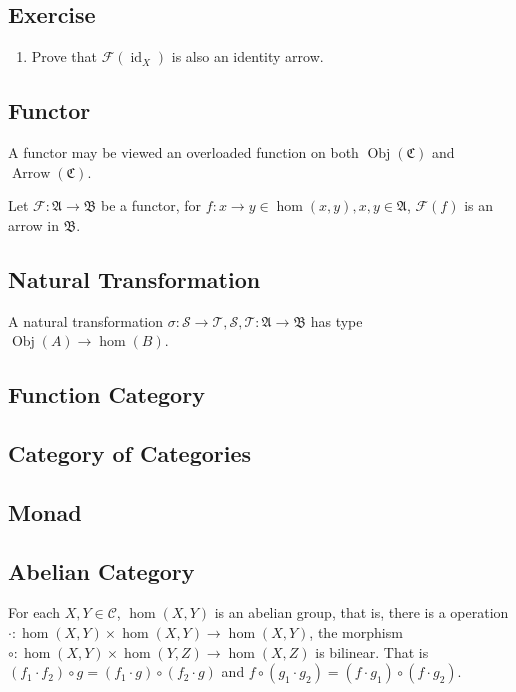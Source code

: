 \documentclass{article}
\newcommand{\id}{\mathop{\mathrm{id}}}
\newcommand{\obj}{\mathop{\mathrm{Obj}}}
\newcommand{\arrow}{\mathop{\mathrm{Arrow}}}
\begin{document}
\subsection*{Exercise}
\begin{enumerate}[1.]
\item Prove that $\mathcal{F}(\id_X)$ is also an identity arrow.
\end{enumerate}

\subsection{Functor}
A functor may be viewed an overloaded function on both $\obj(\mathfrak C)$ and
$\arrow(\mathfrak C)$.

Let $\mathcal F : \mathfrak A \to \mathfrak B$ be a functor,
for $f : x \to y \in \hom(x, y), x, y \in \mathfrak A$,
$\mathcal F(f)$ is an arrow in $\mathfrak B$.


\subsection{Natural Transformation}
A natural transformation
$\sigma : \mathcal S \to \mathcal T,
\mathcal S, \mathcal T : \mathfrak A \to \mathfrak B$ has type
$\obj(A) \to \hom(B)$.


\subsection{Function Category}

\subsection{Category of Categories}

\subsection{Monad}

\subsection{Abelian Category}
For each $X, Y \in \mathcal{C}$, $\hom(X, Y)$ is an abelian group,
that is, there is a operation $\cdot : \hom(X, Y) \times \hom(X, Y) \to \hom(X, Y)$,
the morphism $\circ : \hom(X, Y) \times \hom(Y, Z) \to \hom(X, Z)$ is bilinear.
That is $(f_1 \cdot f_2) \circ g = (f_1 \cdot g) \circ (f_2 \cdot g)$
and $f \circ (g_1 \cdot g_2) = (f \cdot g_1) \circ (f \cdot g_2)$.
\end{document}
